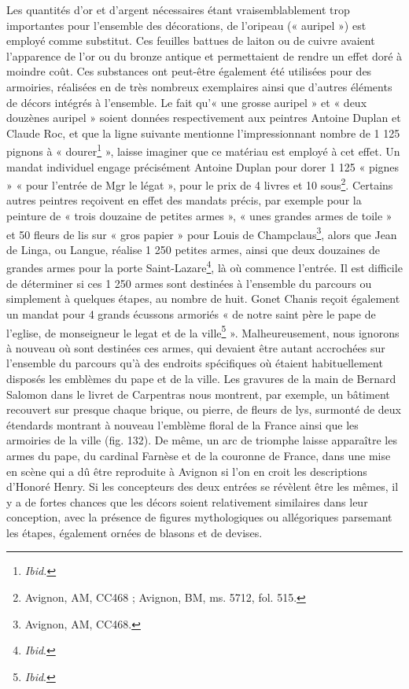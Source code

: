\documentclass[12pt,twoside,openany]{book}
\begin{document}
Les quantités d’or et d’argent nécessaires étant vraisemblablement trop importantes pour l’ensemble des décorations, de l’oripeau (« auripel ») est employé comme substitut. Ces feuilles battues de laiton ou de cuivre avaient l’apparence de l’or ou du bronze antique et permettaient de rendre un effet doré à moindre coût. Ces substances ont peut-être également été utilisées pour des armoiries, réalisées en de très nombreux exemplaires ainsi que d’autres éléments de décors intégrés à l’ensemble. Le fait qu’« une grosse auripel » et « deux douzènes auripel » soient données respectivement aux peintres Antoine Duplan et Claude Roc, et que la ligne suivante mentionne l’impressionnant nombre de 1 125 pignons à « dourer\footnote{\textit{Ibid.}} », laisse imaginer que ce matériau est employé à cet effet. Un mandat individuel engage précisément Antoine Duplan pour dorer 1 125 « pignes » « pour l’entrée de Mgr le légat », pour le prix de 4 livres et 10 sous\footnote{Avignon, AM, CC468 ; Avignon, BM, ms. 5712, fol. 515.}. Certains autres peintres reçoivent en effet des mandats précis, par exemple pour la peinture de « trois douzaine de petites armes », « unes grandes armes de toile » et 50 fleurs de lis sur « gros papier » pour Louis de Champclaus\footnote{Avignon, AM, CC468.}, alors que Jean de Linga, ou Langue, réalise 1 250 petites armes, ainsi que deux douzaines de grandes armes pour la porte Saint-Lazare\footnote{\textit{Ibid}.}, là où commence l’entrée. Il est difficile de déterminer si ces 1 250 armes sont destinées à l’ensemble du parcours ou simplement à quelques étapes, au nombre de huit. Gonet Chanis reçoit également un mandat pour 4 grands écussons armoriés « de notre saint père le pape de l’eglise, de monseigneur le legat et de la ville\footnote{\textit{Ibid}.} ». Malheureusement, nous ignorons à nouveau où sont destinées ces armes, qui devaient être autant accrochées sur l’ensemble du parcours qu’à des endroits spécifiques où étaient habituellement disposés les emblèmes du pape et de la ville. Les gravures de la main de Bernard Salomon dans le livret de Carpentras nous montrent, par exemple, un bâtiment recouvert sur presque chaque brique, ou pierre, de fleurs de lys, surmonté de deux étendards montrant à nouveau l’emblème floral de la France ainsi que les armoiries de la ville (fig. 132). De même, un arc de triomphe laisse apparaître les armes du pape, du cardinal Farnèse et de la couronne de France, dans une mise en scène qui a dû être reproduite à Avignon si l’on en croit les descriptions d’Honoré Henry. Si les concepteurs des deux entrées se révèlent être les mêmes, il y a de fortes chances que les décors soient relativement similaires dans leur conception, avec la présence de figures mythologiques ou allégoriques parsemant les étapes, également ornées de blasons et de devises.
\end{document}
